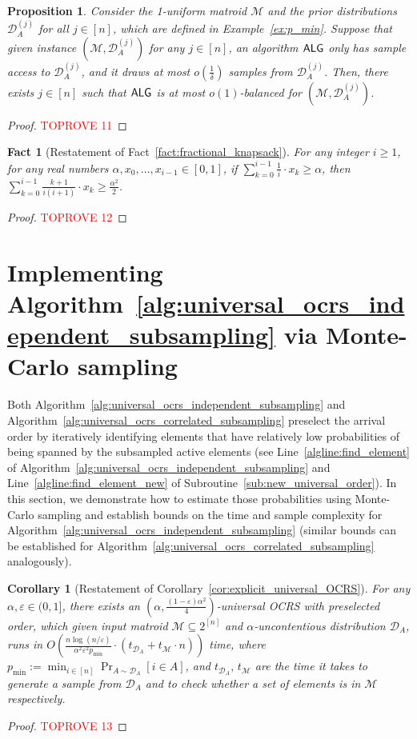\documentclass[11pt]{article}
\newcommand{\D}{\mathcal D}
\newcommand{\M}{{\mathcal M}}
\newcommand{\alg}{\textnormal{\sffamily ALG}}
\newcommand{\eps}{\varepsilon}
\newtheorem{corollary}[theorem]{Corollary}
\newtheorem{fact}[theorem]{Fact}
\newtheorem{proposition}{Proposition}[section]
\begin{document}
\begin{proposition}\label{prop:p_min}
Consider the 1-uniform matroid $\M$ and the prior distributions $\D_{A}^{(j)}$ for all $j\in[n]$, which are defined in Example~\ref{ex:p_min}. Suppose that given instance $(\M,\D_A^{(j)})$ for any $j\in[n]$, an algorithm $\alg$ only has sample access to $\D_A^{(j)}$, and it draws at most $o(\frac{1}{\delta})$ samples from $\D_A^{(j)}$. Then, there exists $j\in[n]$ such that $\alg$ is at most $o(1)$-balanced for $(\M,\D_A^{(j)})$.
\end{proposition}
\begin{proof}\textcolor{red}{TOPROVE 11}\end{proof}

\begin{fact}[Restatement of Fact~\ref{fact:fractional_knapsack}]
For any integer $i\ge1$, for any real numbers $\alpha,x_0,\dots,x_{i-1}\in[0,1]$, if $\sum_{k=0}^{i-1}\frac{1}{i}\cdot x_{k}\ge\alpha$, then $\sum_{k=0}^{i-1} \frac{k+1}{i(i+1)}\cdot x_{k}\ge\frac{\alpha^2}{2}$.
\end{fact}
\begin{proof}\textcolor{red}{TOPROVE 12}\end{proof}

\section{Implementing Algorithm~\ref{alg:universal_ocrs_independent_subsampling} via Monte-Carlo sampling}\label{sec:monte-carlo}
Both Algorithm~\ref{alg:universal_ocrs_independent_subsampling} and Algorithm~\ref{alg:universal_ocrs_correlated_subsampling} preselect the arrival order by iteratively identifying elements that have relatively low probabilities of being spanned by the subsampled active elements (see Line~\ref{algline:find_element} of Algorithm~\ref{alg:universal_ocrs_independent_subsampling} and Line~\ref{algline:find_element_new} of Subroutine~\ref{sub:new_universal_order}). In this section, we demonstrate how to estimate those probabilities using Monte-Carlo sampling and establish bounds on the time and sample complexity for Algorithm~\ref{alg:universal_ocrs_independent_subsampling} (similar bounds can be established for Algorithm~\ref{alg:universal_ocrs_correlated_subsampling} analogously).
\begin{corollary}[Restatement of Corollary~\ref{cor:explicit_universal_OCRS}]
For any $\alpha,\eps\in(0,1]$, there exists an $(\alpha,\frac{(1-\eps)\alpha^2}{4})$-universal OCRS with preselected order, which given input matroid $\M\subseteq2^{[n]}$ and $\alpha$-uncontentious distribution $\D_A$, runs in $O\left(\frac{n\log(n/\eps)}{\alpha^2\eps^2 p_{\min}}\cdot (t_{\D_A}+t_{\M}\cdot n)\right)$ time, where $p_{\min}:=\min_{i\in[n]}\Pr_{A\sim\D_A}[i\in A]$, and $t_{\D_A},\,t_{\M}$ are the time it takes to generate a sample from $\D_A$ and to check whether a set of elements is in $\M$ respectively.
\end{corollary}
\begin{proof}\textcolor{red}{TOPROVE 13}\end{proof}
\end{document}
